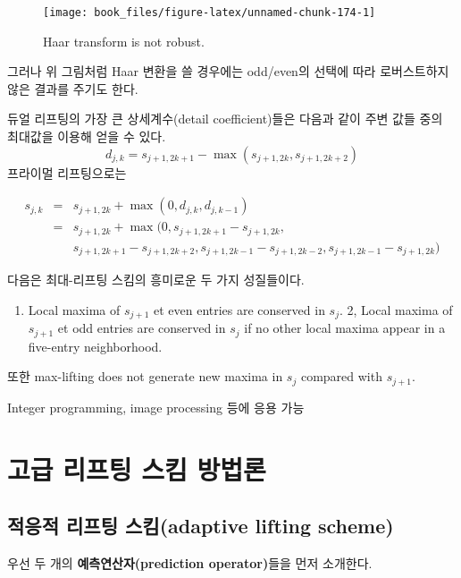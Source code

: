 \documentclass[b5paper,]{scrbook}
\providecommand{\tightlist}{%
  \setlength{\itemsep}{0pt}\setlength{\parskip}{0pt}}
\theoremstyle{plain}
\theoremstyle{definition}
\numberwithin{equation}{section}
\begin{document}
\begin{figure}

{\centering \texttt{[image: book\_files/figure-latex/unnamed-chunk-174-1]} 

}

\caption{Haar transform is not robust.}\label{fig:unnamed-chunk-174}
\end{figure}

그러나 위 그림처럼 Haar 변환을 쓸 경우에는 odd/even의 선택에 따라
로버스트하지 않은 결과를 주기도 한다.

듀얼 리프팅의 가장 큰 상세계수(detail coefficient)들은 다음과 같이 주변
값들 중의 최대값을 이용해 얻을 수 있다.
\[d_{j,k}=s_{j+1,2k+1}-\max(s_{j+1,2k},s_{j+1,2k+2})\] 프라이멀
리프팅으로는

\begin{eqnarray*}
s_{j,k}&=& s_{j+1,2k}+\max (0,d_{j,k},d_{j,k-1})\\
&=&s_{j+1,2k}+\max (0, s_{j+1,2k+1}-s_{j+1,2k}, \\
& &s_{j+1,2k+1}-s_{j+1,2k+2}, s_{j+1,2k-1}-s_{j+1,2k-2}, s_{j+1,2k-1}-s_{j+1,2k})
\end{eqnarray*}

다음은 최대-리프팅 스킴의 흥미로운 두 가지 성질들이다.

\begin{enumerate}
\def\labelenumi{\arabic{enumi}.}
\tightlist
\item
  Local maxima of \(s_{j+1}\) et even entries are conserved in
  \(s_{j}\). 2, Local maxima of \(s_{j+1}\) et odd entries are conserved
  in \(s_{j}\) if no other local maxima appear in a five-entry
  neighborhood.
\end{enumerate}

또한 max-lifting does not generate new maxima in \(s_{j}\) compared with
\(s_{j+1}\).

Integer programming, image processing 등에 응용 가능

\chapter{고급 리프팅 스킴 방법론}\label{advlifting}

\section{적응적 리프팅 스킴(adaptive lifting
scheme)}\label{--adaptive-lifting-scheme}

우선 두 개의 \textbf{예측연산자(prediction operator)}들을 먼저 소개한다.
\end{document}

